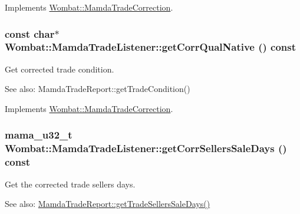 Implements \hyperlink{classWombat_1_1MamdaTradeCorrection_f196c22d5419d952815af377bbd9639c}{Wombat::Mamda\-Trade\-Correction}.\hypertarget{classWombat_1_1MamdaTradeListener_6b897066a80ca51774b8aa13e676b180}{
\subsubsection[getCorrQualNative]{\setlength{\rightskip}{0pt plus 5cm}const char$\ast$ Wombat::Mamda\-Trade\-Listener::get\-Corr\-Qual\-Native () const}}
\label{classWombat_1_1MamdaTradeListener_6b897066a80ca51774b8aa13e676b180}


Get corrected trade condition. 

\begin{Desc}
\item[See also:]Mamda\-Trade\-Report::get\-Trade\-Condition() \end{Desc}


Implements \hyperlink{classWombat_1_1MamdaTradeCorrection_9506794767b00b9609a232b2bc3328f0}{Wombat::Mamda\-Trade\-Correction}.\hypertarget{classWombat_1_1MamdaTradeListener_6078e3eb707240536af985d4135ccc5f}{
\subsubsection[getCorrSellersSaleDays]{\setlength{\rightskip}{0pt plus 5cm}mama\_\-u32\_\-t Wombat::Mamda\-Trade\-Listener::get\-Corr\-Sellers\-Sale\-Days () const}}
\label{classWombat_1_1MamdaTradeListener_6078e3eb707240536af985d4135ccc5f}


Get the corrected trade sellers days. 

\begin{Desc}
\item[See also:]\hyperlink{classWombat_1_1MamdaTradeReport_c9ed0e49599c96128f6be2a1e3390a33}{Mamda\-Trade\-Report::get\-Trade\-Sellers\-Sale\-Days()} \end{Desc}


